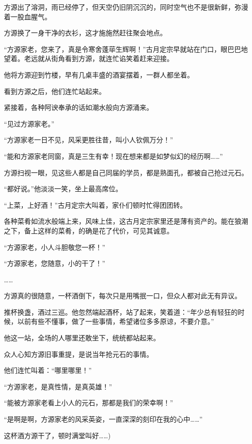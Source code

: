 \begin{this_body}
方源出了溶洞，雨已经停了，但天空仍旧阴沉沉的，同时空气也不是很新鲜，弥漫着一股血腥气。

方源换了一身干净的衣衫，这才施施然赶往聚会地点。

“方源家老，您来了，真是令寒舍蓬荜生辉啊！”古月定宗早就站在门口，眼巴巴地望着。老远就从街角看到方源，就连忙谄笑着赶来迎接。

他将方源迎到竹楼，早有几桌丰盛的酒宴摆着，一群人都坐着。

看到方源之后，他们连忙站起来。

紧接着，各种阿谀奉承的话如潮水般向方源涌来。

“见过方源家老。”

“方源家老一日不见，风采更胜往昔，叫小人钦佩万分！”

“能和方源家老同窗，真是三生有幸！现在想来都是如梦似幻的经历啊……”

方源扫视一眼，见这些人都是自己同届的学员，都是熟面孔，都被自己抢过元石。

“都好说。”他淡淡一笑，坐上最高席位。

“上菜，上好酒！”古月定宗大叫着，家仆们顿时忙得团团转。

各种菜肴如流水般端上来，风味上佳，这古月定宗家里还是薄有资产的。能在狼潮之下，备上这样的菜肴，的确是花了代价，可见其诚意。

“方源家老，小人斗胆敬您一杯！”

“方源家老，您随意，小的干了！”

……

方源真的很随意，一杯酒倒下，每次只是用嘴抿一口，但众人都对此无有异议。

推杯换盏，酒过三巡。他忽然端起酒杯，站了起来，笑着道：“年少总有轻狂的时候，以前有些不懂事，做了一些事情，希望诸位多多原谅，不要介意。”

他这一站，全场的人哪里还敢坐下，统统都站起来。

众人心知方源旧事重提，是说当年抢元石的事情。

他们连忙叫着：“哪里哪里！”

“方源家老，是真性情，是真英雄！”

“能被方源家老看上小人的元石，那都是我们的荣幸啊！”

“是啊是啊，方源家老的风采英姿，一直深深的刻印在我的心中……”

这杯酒方源干了，顿时满堂叫好……)

\end{this_body}

